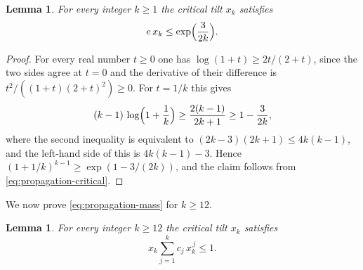 \documentclass{amsart}
\newtheorem{lemma}[theorem]{Lemma}
\theoremstyle{definition}
\theoremstyle{remark}
\numberwithin{equation}{section}
\begin{document}
\begin{lemma}\label{lem:tiltupper}
For every integer $k\ge1$ the critical tilt $x_k$ satisfies
\[
e\,x_k\le\exp\Bigl(\frac{3}{2k}\Bigr).
\]
\end{lemma}

\begin{proof}
For every real number $t\ge0$ one has $\log(1+t)\ge2t/(2+t)$, since the two
sides agree at $t=0$ and the derivative of their difference is
$t^2/((1+t)(2+t)^2)\ge0$. For $t=1/k$ this gives
\[
(k-1)\,\log\Bigl(1+\frac1k\Bigr)\ge\frac{2(k-1)}{2k+1}\ge1-\frac{3}{2k} ,
\]
where the second inequality is equivalent to $(2k-3)(2k+1)\le4k(k-1)$, and
the left-hand side of this is $4k(k-1)-3$. Hence
$(1+1/k)^{k-1}\ge\exp(1-3/(2k))$, and the claim follows from
\eqref{eq:propagation-critical}.
\end{proof}

We now prove \eqref{eq:propagation-mass} for $k\ge12$.

\begin{lemma}\label{lem:cayleysum}
For every integer $k\ge12$ the critical tilt $x_k$ satisfies
\[
x_k\sum_{j=1}^{k}c_j\,x_k^{\,j}\le1 .
\]
\end{lemma}
\end{document}
